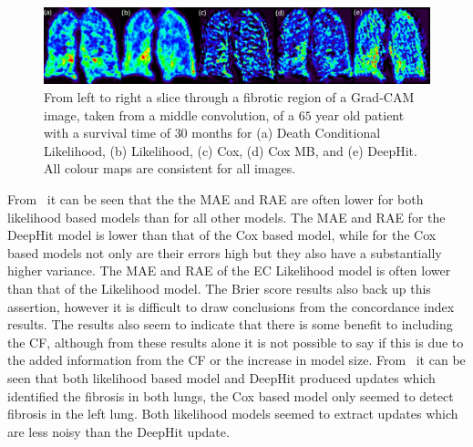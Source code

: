         \begin{figure}\centering
    
            \includegraphics[width=1.0\linewidth]{figures/survival_analysis_grad_cam_label.png}
            
            \captionsetup{singlelinecheck=false}
            \caption{
                From left to right a slice through a fibrotic region of a \gls{Grad-CAM} image, taken from a middle convolution, of a $65$ year old patient with a survival time of $30$ months for (a) Death Conditional Likelihood, (b) Likelihood, (c) Cox, (d) Cox \gls{MB}, and (e) DeepHit. All colour maps are consistent for all images.
            }
            \label{fig:deep_learning_for_ct_based_survival_analysis_of_idiopathic_pulmonary_fibrosis_patients_appendix_results_grad_cam}
       \end{figure}
    
        From~ it can be seen that the the \gls{MAE} and \gls{RAE} are often lower for both likelihood based models than for all other models. The \gls{MAE} and \gls{RAE} for the DeepHit model is lower than that of the Cox based model, while for the Cox based models not only are their errors high but they also have a substantially higher variance. The \gls{MAE} and \gls{RAE} of the \gls{EC} Likelihood model is often lower than that of the Likelihood model. The Brier score results also back up this assertion, however it is difficult to draw conclusions from the concordance index results. The results also seem to indicate that there is some benefit to including the \gls{CF}, although from these results alone it is not possible to say if this is due to the added information from the \gls{CF} or the increase in model size. From~ it can be seen that both likelihood based model and DeepHit produced updates which identified the fibrosis in both lungs, the Cox based model only seemed to detect fibrosis in the left lung. Both likelihood models seemed to extract updates which are less noisy than the DeepHit update.
    
